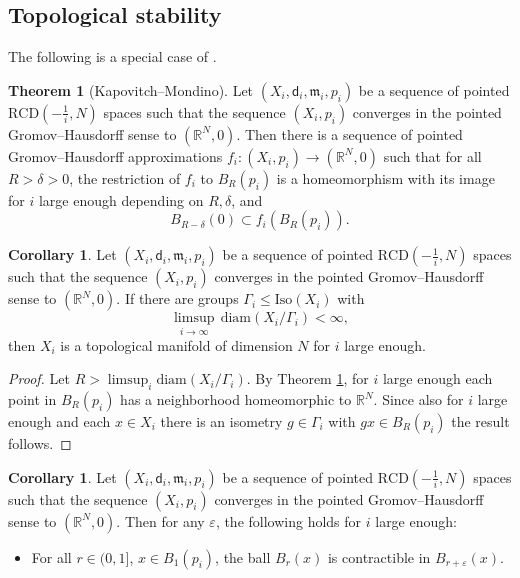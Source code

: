 \documentclass[12pt]{amsart}
\theoremstyle{definition}
\def\fnum{equation}
\newtheorem{theorem}[\fnum]{Theorem}
\newtheorem{corollary}[\fnum]{Corollary}
\numberwithin{equation}{section}
\newcommand{\diam}{{\text {diam}}}
\newcommand{\iso}{\text{Iso}}
\newcommand{\rcd}{\text{RCD}}
\newcommand{\mm}{\mathfrak{m}}
\begin{document}
\color{black}


\subsection{Topological stability} The following is a special case of  \cite[Theorem 2.9]{kapovitch-mondino}.



\begin{theorem}[Kapovitch--Mondino]\label{thm:reifenberg-weak}
{
Let $(X_i, \mathsf{d}_i, \mm_i,  p_i)$ be a sequence of pointed $\rcd ( - \frac{1}{i} ,N)$ spaces such that the sequence $(X_i, p_i)$ converges in the pointed Gromov--Hausdorff sense to $(\mathbb{R}^N, 0)$. Then there is a sequence of pointed Gromov--Hausdorff approximations $f_i : (X_i , p_i) \to ( \mathbb{R}^N , 0 ) $ such that for all $R > \delta > 0$, the restriction of $f_i$ to $B_R(p_i)$ is a homeomorphism with its image for $i$ large enough depending on $R,\delta$, and
        \[            B_{R - \delta }(0) \subset f_i (B_R(p_i)) .  \] 
}

\end{theorem}


\begin{corollary}\label{cor:manifold-reifenberg}
     Let $(X_i, \mathsf{d}_i, \mm_i,  p_i)$ be a sequence of pointed $\rcd ( - \frac{1}{i} ,N)$ spaces such that the sequence $(X_i, p_i)$ converges in the pointed Gromov--Hausdorff sense to $(\mathbb{R}^N, 0)$. If there are groups $\Gamma _ i \leq \iso (X_i) $ with 
     \[ \limsup_{i \to \infty } \, \diam (X_i / \Gamma_i ) < \infty, \]
     then $X_i$ is a topological manifold of dimension $N$ for $i$ large enough.
\end{corollary}

\begin{proof}
  Let $R  > \limsup_i \diam (X_i / \Gamma _ i )$. By Theorem \ref{thm:reifenberg-weak}, for $i$ large enough each point in $B_{R}(p_i)$  has a neighborhood homeomorphic to $\mathbb{R}^N$. Since also for $i$ large enough and each $x \in X_i$ there is an isometry $g \in \Gamma_i$ with $gx \in B_{R}(p_i)$ the result follows. 
\end{proof}


\begin{corollary}\label{cor:locally-contractible-reifenberg}
     Let $(X_i, \mathsf{d}_i, \mm_i,  p_i)$ be a sequence of pointed $\rcd ( - \frac{1}{i} ,N)$ spaces such that the sequence $(X_i, p_i)$ converges in the pointed Gromov--Hausdorff sense to $(\mathbb{R}^N, 0)$. Then for any $\varepsilon$, the following holds for $i$ large enough:
    \begin{itemize}
        \item For all $r \in ( 0 , 1]$, $x \in B_{1}(p_i)$, the ball $B_r(x)$ is contractible in $B_{r + \varepsilon }(x)$. 
    \end{itemize}
\end{corollary}
\end{document}
